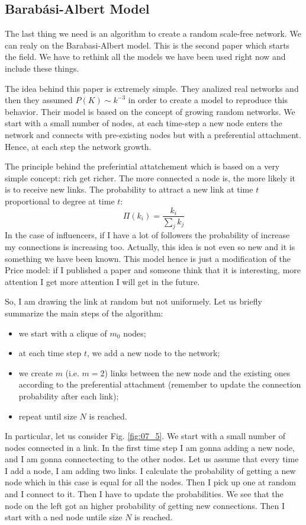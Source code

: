 \documentclass[../main/main.tex]{subfiles}
\begin{document}
\subsection{Barabási-Albert Model}
The last thing we need is an algorithm to create a random scale-free network. We can realy on the Barabasi-Albert model. This is the second paper which starts the field. We have to rethink all the models we have been used right now and include these things.

The idea behind this paper is extremely simple. They analized real networks and then they assumed \( P(K) \sim k^{-3} \) in order to create a model to reproduce this behavior.
Their model is based on the concept of growing random networks.
We start with a small number of nodes, at each time-step a new node enters the network and connects with pre-existing nodes but with a preferential attachment.
Hence, at each step the network growth.

The principle behind the preferintial attatchement which is based on a very simple concept: rich get richer. The more connected a node is, the more likely it is to receive new links. The probability to attract a new link at time $t$ proportional to degree at time $t$:
\begin{equation}
  \Pi (k_i) = \frac{k_i}{\sum_{j}^{} k_j }
\end{equation}
In the case of influencers, if I have a lot of followers the probability of increase my connections is increasing too. Actually, this idea is not even so new and it is something we have been known. This model hence is just a modification of the Price model: if I published a paper and someone think that it is interesting, more attention I get more attention I will get in the future.


So, I am drawing the link at random but not uniformely. Let us briefly summarize the main steps of the algorithm:
\begin{itemize}
\item we start with a clique of \( m_0 \) nodes;
\item at each time step \( t \), we add a new node to the network;
\item we create $m$ (i.e. $m=2$) links between the new node and the existing ones according to the preferential attachment (remember to update the connection probability after each link);
\item repeat until size $N$ is reached.
\end{itemize}
In particular, let us consider Fig. \ref{fig:07_5}. We start with a small number of nodes connected in a link. In the first time step I am gonna adding a new node, and I am gonna connectecting to the other nodes. Let us assume that every time I add a node, I am adding two links. I calculate the probability of getting a new node which in this case is equal for all the nodes. Then I pick up one at random and I connect to it. Then I have to update the probabilities. We see that the node on the left got an higher probability of getting new connections. Then I start with a ned node untile size \( N \) is reached.
\end{document}
